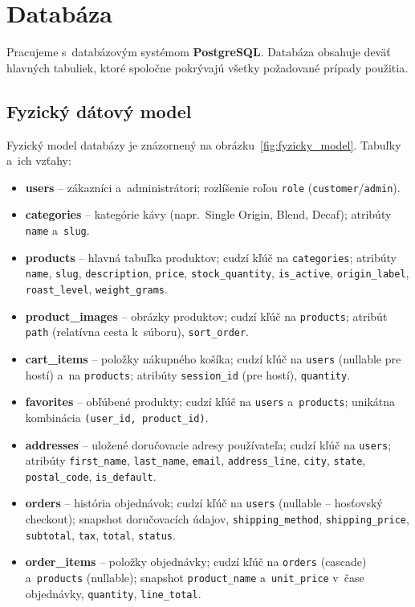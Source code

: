 \documentclass[12pt, a4paper]{article}
\begin{document}
\section{Databáza}

Pracujeme s~databázovým systémom \textbf{PostgreSQL}. Databáza obsahuje deväť hlavných tabuliek, ktoré spoločne pokrývajú všetky požadované prípady použitia.

\subsection{Fyzický dátový model}

Fyzický model databázy je znázornený na obrázku~\ref{fig:fyzicky_model}. Tabuľky a~ich vzťahy:

\begin{itemize}
  \item \textbf{users} -- zákazníci a~administrátori; rozlíšenie roľou \texttt{role} (\texttt{customer}/\texttt{admin}).
  \item \textbf{categories} -- kategórie kávy (napr.\ Single Origin, Blend, Decaf); atribúty \texttt{name} a~\texttt{slug}.
  \item \textbf{products} -- hlavná tabuľka produktov; cudzí kľúč na \texttt{categories}; atribúty \texttt{name}, \texttt{slug}, \texttt{description}, \texttt{price}, \texttt{stock\_quantity}, \texttt{is\_active}, \texttt{origin\_label}, \texttt{roast\_level}, \texttt{weight\_grams}.
  \item \textbf{product\_images} -- obrázky produktov; cudzí kľúč na \texttt{products}; atribút \texttt{path} (relatívna cesta k~súboru), \texttt{sort\_order}.
  \item \textbf{cart\_items} -- položky nákupného košíka; cudzí kľúč na \texttt{users} (nullable pre hostí) a~na \texttt{products}; atribúty \texttt{session\_id} (pre hostí), \texttt{quantity}.
  \item \textbf{favorites} -- obľúbené produkty; cudzí kľúč na \texttt{users} a~\texttt{products}; unikátna kombinácia \texttt{(user\_id, product\_id)}.
  \item \textbf{addresses} -- uložené doručovacie adresy používateľa; cudzí kľúč na \texttt{users}; atribúty \texttt{first\_name}, \texttt{last\_name}, \texttt{email}, \texttt{address\_line}, \texttt{city}, \texttt{state}, \texttt{postal\_code}, \texttt{is\_default}.
  \item \textbf{orders} -- história objednávok; cudzí kľúč na \texttt{users} (nullable -- hosťovský checkout); snapshot doručovacích údajov, \texttt{shipping\_method}, \texttt{shipping\_price}, \texttt{subtotal}, \texttt{tax}, \texttt{total}, \texttt{status}.
  \item \textbf{order\_items} -- položky objednávky; cudzí kľúč na \texttt{orders} (cascade) a~\texttt{products} (nullable); snapshot \texttt{product\_name} a~\texttt{unit\_price} v~čase objednávky, \texttt{quantity}, \texttt{line\_total}.
\end{itemize}
\end{document}
